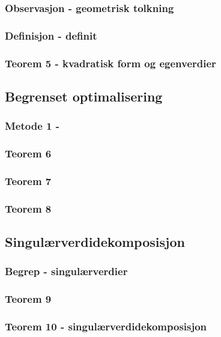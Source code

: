\documentclass{article}
\begin{document}
      \subsubsection{Observasjon - geometrisk tolkning}
        
      \subsubsection{Definisjon - definit}
        
      \subsubsection{Teorem 5 - kvadratisk form og egenverdier}
        
    \subsection{Begrenset optimalisering}
      \subsubsection{Metode 1 - }
        
      \subsubsection{Teorem 6}
        
      \subsubsection{Teorem 7}
        
      \subsubsection{Teorem 8}
        
    \subsection{Singulærverdidekomposisjon}
      \subsubsection{Begrep - singulærverdier}
        
      \subsubsection{Teorem 9}
        
      \subsubsection{Teorem 10 - singulærverdidekomposisjon}
        
\end{document}

